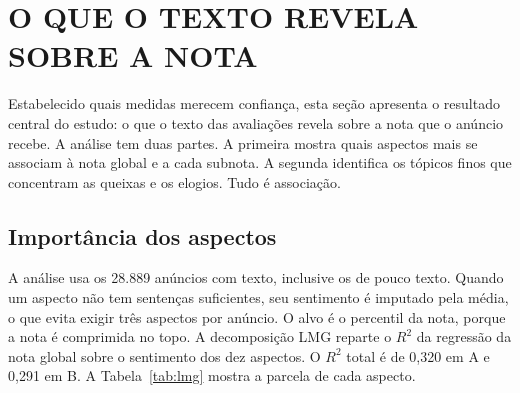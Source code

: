 \section{O QUE O TEXTO REVELA SOBRE A NOTA}

Estabelecido quais medidas merecem confiança, esta seção apresenta o resultado central do estudo: o que o texto das avaliações revela sobre a nota que o anúncio recebe. A análise tem duas partes. A primeira mostra quais aspectos mais se associam à nota global e a cada subnota. A segunda identifica os tópicos finos que concentram as queixas e os elogios. Tudo é associação.

\subsection{Importância dos aspectos}

A análise usa os 28.889 anúncios com texto, inclusive os de pouco texto. Quando um aspecto não tem sentenças suficientes, seu sentimento é imputado pela média, o que evita exigir três aspectos por anúncio. O alvo é o percentil da nota, porque a nota é comprimida no topo. A decomposição LMG reparte o $R^2$ da regressão da nota global sobre o sentimento dos dez aspectos. O $R^2$ total é de 0,320 em A e 0,291 em B. A Tabela~\ref{tab:lmg} mostra a parcela de cada aspecto.

\begin{table}[htb]
\centering
\caption{Parcela do $R^2$ da nota global atribuída a cada aspecto (decomposição LMG).}
\small
{}
\label{tab:lmg}
\end{table}

